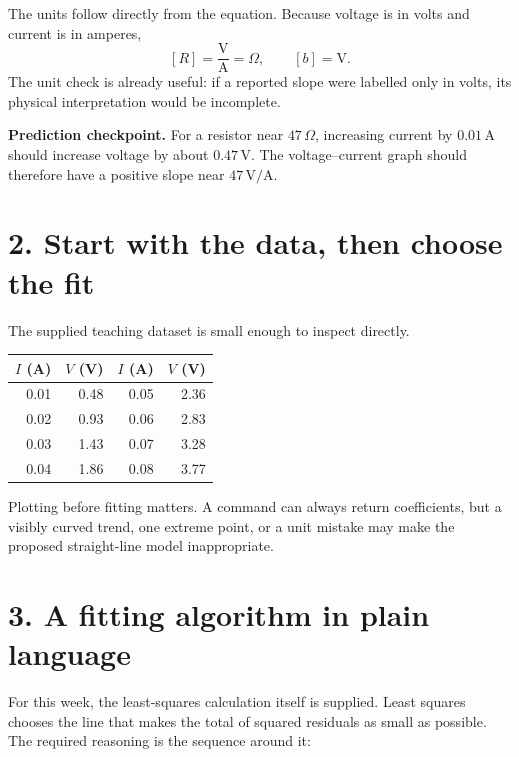 \documentclass[11pt,a4paper]{article}
\newcommand{\units}[1]{\,\mathrm{#1}}
\begin{document}
The units follow directly from the equation. Because voltage is in volts and current is in amperes,
\[
[R]=\frac{\mathrm{V}}{\mathrm{A}}=\Omega,
\qquad [b]=\mathrm{V}.
\]
The unit check is already useful: if a reported slope were labelled only in volts, its physical interpretation would be incomplete.

\begin{checkbox}\textbf{Prediction checkpoint.} For a resistor near $47\,\Omega$, increasing current by $0.01\units{A}$ should increase voltage by about $0.47\units{V}$. The voltage--current graph should therefore have a positive slope near $47\units{V/A}$.\end{checkbox}

\section*{2. Start with the data, then choose the fit}
The supplied teaching dataset is small enough to inspect directly.

\begin{center}\small
\begin{tabular}{rr@{\qquad}rr}
\toprule
$I$ (A) & $V$ (V) & $I$ (A) & $V$ (V)\\
\midrule
0.01 & 0.48 & 0.05 & 2.36\\
0.02 & 0.93 & 0.06 & 2.83\\
0.03 & 1.43 & 0.07 & 3.28\\
0.04 & 1.86 & 0.08 & 3.77\\
\bottomrule
\end{tabular}
\end{center}

Plotting before fitting matters. A command can always return coefficients, but a visibly curved trend, one extreme point, or a unit mistake may make the proposed straight-line model inappropriate.

\section*{3. A fitting algorithm in plain language}
For this week, the least-squares calculation itself is supplied. Least squares chooses the line that makes the total of squared residuals as small as possible. The required reasoning is the sequence around it:
\end{document}
